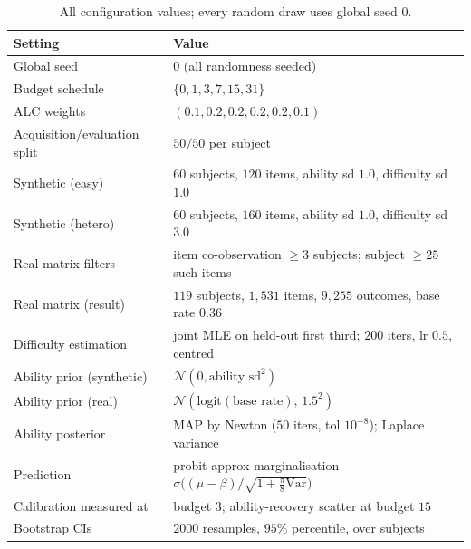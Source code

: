 \documentclass{article}
\begin{document}
\begin{table}[h]
  \centering
  \caption{All configuration values; every random draw uses global seed $0$.}
  \begin{tabular}{ll}
    \toprule
    Setting & Value \\
    \midrule
    Global seed & $0$ (all randomness seeded) \\
    Budget schedule & $\{0,1,3,7,15,31\}$ \\
    ALC weights & $(0.1,0.2,0.2,0.2,0.2,0.1)$ \\
    Acquisition/evaluation split & $50/50$ per subject \\
    \midrule
    Synthetic (easy) & $60$ subjects, $120$ items, ability sd $1.0$, difficulty sd $1.0$ \\
    Synthetic (hetero) & $60$ subjects, $160$ items, ability sd $1.0$, difficulty sd $3.0$ \\
    Real matrix filters & item co-observation $\ge 3$ subjects; subject $\ge 25$ such items \\
    Real matrix (result) & $119$ subjects, $1{,}531$ items, $9{,}255$ outcomes, base rate $0.36$ \\
    \midrule
    Difficulty estimation & joint MLE on held-out first third; $200$ iters, lr $0.5$, centred \\
    Ability prior (synthetic) & $\mathcal N(0,\text{ability sd}^2)$ \\
    Ability prior (real) & $\mathcal N(\mathrm{logit}(\text{base rate}),\,1.5^2)$ \\
    Ability posterior & MAP by Newton ($50$ iters, tol $10^{-8}$); Laplace variance \\
    Prediction & probit-approx marginalisation $\sigma\!\big((\mu-\beta)/\sqrt{1+\tfrac{\pi}{8}\mathrm{Var}}\big)$ \\
    Calibration measured at & budget $3$; ability-recovery scatter at budget $15$ \\
    Bootstrap CIs & $2000$ resamples, $95\%$ percentile, over subjects \\
    \bottomrule
  \end{tabular}
\end{table}
\end{document}
